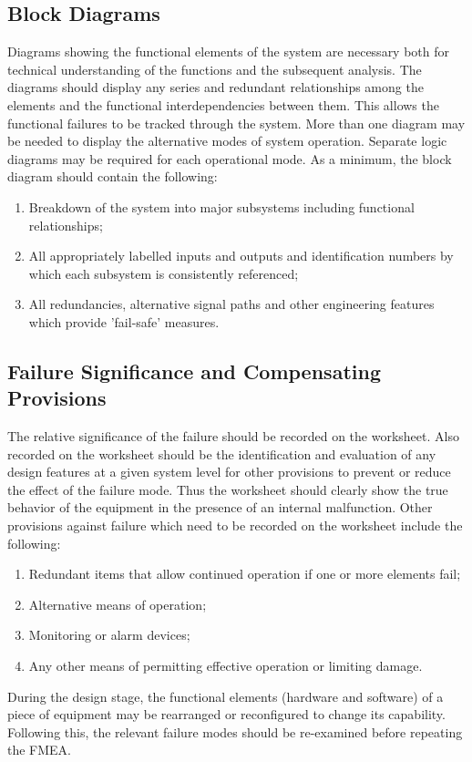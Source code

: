 \documentclass[./dissertation.tex]{subfiles}
\begin{document}
\subsection{Block Diagrams}

Diagrams showing the functional elements of the
system are necessary both for technical understanding of the functions and the subsequent analysis. The diagrams should display any series and redundant relationships among the elements and the functional interdependencies between them. This allows the functional failures to be tracked through the system. More than one diagram may be needed to display the alternative modes of system operation. Separate logic diagrams may be required for each operational mode. As a minimum, the block diagram should contain the following:

\begin{enumerate}
\item Breakdown of the system into major subsystems including functional relationships;
\item All appropriately labelled inputs and outputs and identification numbers by which each subsystem is consistently referenced;
\item All redundancies, alternative signal paths and other engineering features which provide 'fail-safe' measures.
\end{enumerate}

\subsection{Failure Significance and Compensating Provisions}

The relative significance of the failure should be recorded on the worksheet. Also recorded on the worksheet should be the identification and evaluation of any design features at a given system level for other provisions to prevent or reduce the effect of the failure mode. Thus the worksheet should clearly show the true behavior of the equipment in the presence of an internal malfunction. Other provisions against failure which need to be recorded on the worksheet include the following:

\begin{enumerate}
\item Redundant items that allow continued operation if one or more elements fail;
\item Alternative means of operation;
\item Monitoring or alarm devices;
\item Any other means of permitting effective operation or limiting damage.
\end{enumerate}

During the design stage, the functional elements (hardware and software) of a piece of equipment may be rearranged or reconfigured to change its capability. Following this, the relevant failure modes should be re-examined before repeating the FMEA.
\end{document}
